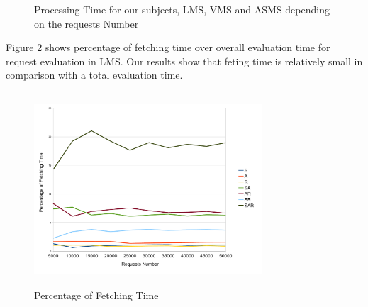 \begin{figure}
  \centering
  \caption{Processing Time for our subjects, LMS, VMS and ASMS depending on the requests Number}
  \label{fig:processing time}
\end{figure}

Figure \ref{Fetching Time} shows percentage of fetching time over overall evaluation time for request evaluation in LMS. Our
results show that feting time is relatively small in comparison with a total evaluation time.
  

\begin{figure}[!h]
  \centering
\includegraphics[width=8.5cm, height=7.2cm]{fetching.pdf}
\begin{center}
\caption{Percentage of Fetching Time}
\label{Fetching Time}
\end{center}
\end{figure} 


